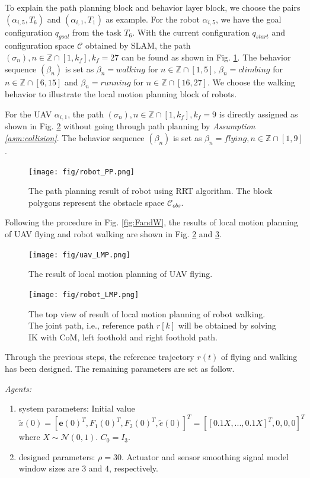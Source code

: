 \documentclass{ieeeaccess}
\begin{document}
To explain the path planning block and behavior layer block, we choose the pairs $(\alpha_{i,5},T_6)$ and $(\alpha_{i,1}, T_1)$ as example. For the robot $\alpha_{i,5}$, we have the goal configuration $q_{goal}$ from the task $T_6$. With the current configuration $q_{start}$ and configuration space $\mathcal{C}$ obtained by SLAM, the path $(\sigma_n),n\in\mathbb{Z}\cap[1,k_f],k_f=27$ can be found as shown in Fig. \ref{fig:R_task}. The behavior sequence $(\beta_n)$ is set as $\beta_n=\mathit{walking}$ for $n\in\mathbb{Z}\cap[1,5]$, $\beta_n=\mathit{climbing}$ for $n\in\mathbb{Z}\cap[6,15]$ and $\beta_n=\mathit{running}$ for $n\in\mathbb{Z}\cap[16,27]$. We choose the walking behavior to illustrate the local motion planning block of robots.

For the UAV $\alpha_{i,1}$, the path $(\sigma_n),n\in\mathbb{Z}\cap[1,k_f],k_f=9$ is directly assigned as shown in Fig. \ref{sim:flying} without going through path planning by \textit{Assumption \ref{asm:collision}}. The behavior sequence $(\beta_n)$ is set as $\beta_n=\mathit{flying}, n\in\mathbb{Z}\cap[1,9]$.
\begin{figure}[htbp]
    \centering
    \texttt{[image: fig/robot\_PP.png]}\caption{The path planning result of robot using RRT algorithm. The block polygons represent the obstacle space $\mathcal{C}_{obs}$.}%
    \label{fig:R_task}
\end{figure}

Following the procedure in Fig. \ref{fig:FandW}, the results of local motion planning of UAV flying and robot walking are shown in Fig. \ref{sim:flying} and \ref{sim:walking}.
\begin{figure}[htbp]
    \centering
    \texttt{[image: fig/uav\_LMP.png]}\caption{The result of local motion planning of UAV flying.}%
    \label{sim:flying}
\end{figure}
\begin{figure}[htbp]
    \centering
    \texttt{[image: fig/robot\_LMP.png]}\caption{The top view of result of local motion planning of robot walking. The joint path, i.e., reference path $r[k]$ will be obtained by solving IK with CoM, left foothold and right foothold path.}
    \label{sim:walking}
\end{figure}

Through the previous steps, the reference trajectory $r(t)$ of flying and walking has been designed. The remaining parameters are set as follow.

\textit{Agents:}\begin{enumerate}
    \item system parameters:
    Initial value $\tilde{x}(0) = [\pmb{e}(0)^T, F_1(0)^T\mathbin{,} F_2(0)^T, \tilde{e}(0)]^T = [[0.1X, ..., 0.1X]^T, 0, 0, 0]^T$ where $X \sim \mathcal{N}(0, 1)$. $C_0 = I_3$.
    \item designed parameters: $\rho=30$. Actuator and sensor smoothing signal model window sizes are $3$ and $4$, respectively.
\end{enumerate}
\end{document}
